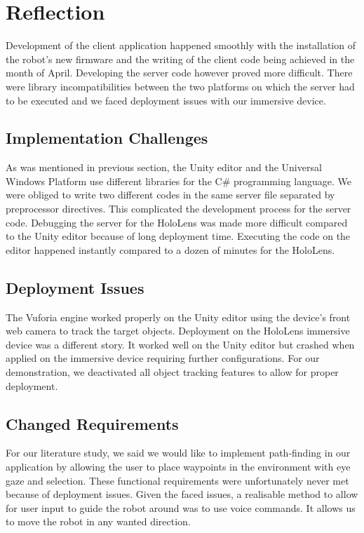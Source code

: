 \section{Reflection}
Development of the client application happened smoothly with the installation of the robot's new firmware and the writing of the client code being achieved in the month of April. Developing the server code however proved more difficult. There were library incompatibilities between the two platforms on which the server had to be executed and we faced deployment issues with our immersive device.

\subsection{Implementation Challenges}
As was mentioned in previous section, the Unity editor and the Universal Windows Platform use different libraries for the C\# programming language. We were obliged to write two different codes in the same server file separated by preprocessor directives. This complicated the development process for the server code. Debugging the server for the HoloLens was made more difficult compared to the Unity editor because of long deployment time. Executing the code on the editor happened instantly compared to a dozen of minutes for the HoloLens.

\subsection{Deployment Issues}
The Vuforia engine worked properly on the Unity editor using the device's front web camera to track the target objects. Deployment on the HoloLens immersive device was a different story. It worked well on the Unity editor but crashed when applied on the immersive device requiring further configurations. For our demonstration, we deactivated all object tracking features to allow for proper deployment.


\subsection{Changed Requirements}
For our literature study, we said we would like to implement path-finding in our application by allowing the user to place waypoints in the environment with eye gaze and selection. These functional requirements were unfortunately never met because of deployment issues.
Given the faced issues, a realisable method to allow for user input to guide the robot around was to use voice commands. It allows us to move the robot in any wanted direction.


